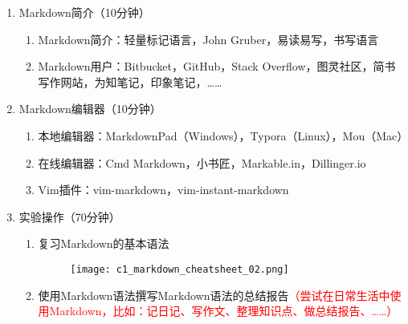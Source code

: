 \documentclass{TIJMUjiaoanSY}
\begin{document}
\firstTail

\newpage
\otherHeader

\begin{enumerate}
  \item Markdown简介（10分钟）
    \begin{enumerate}
      \item Markdown简介：轻量标记语言，John Gruber，易读易写，书写语言
      \item Markdown用户：Bitbucket，GitHub，Stack Overflow，图灵社区，简书写作网站，为知笔记，印象笔记，……
    \end{enumerate}
  \item Markdown编辑器（10分钟）
    \begin{enumerate}
      \item 本地编辑器：MarkdownPad（Windows），Typora（Linux），Mou（Mac）
      \item 在线编辑器：Cmd Markdown，小书匠，Markable.in，Dillinger.io
      \item Vim插件：vim-markdown，vim-instant-markdown
    \end{enumerate}
  \item 实验操作（70分钟）
    \begin{enumerate}
      \item 复习Markdown的基本语法
    \begin{figure}[h]
      \centering
      \texttt{[image: c1\_markdown\_cheatsheet\_02.png]}
    \end{figure}
  \item
    使用Markdown语法撰写Markdown语法的总结报告\textcolor{red}{（尝试在日常生活中使用Markdown，比如：记日记、写作文、整理知识点、做总结报告、……）}
    \end{enumerate}
\end{enumerate}

\otherTail
\end{document}

